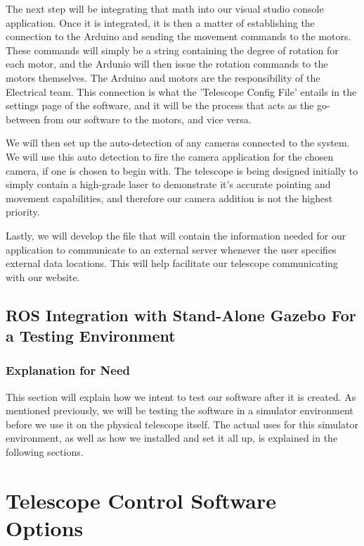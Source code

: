 \documentclass[12pt]{report}
\begin{document}
The next step will be integrating that math into our visual studio console application. Once it is integrated, it is then a matter of establishing the connection to the Arduino and sending the movement commands to the motors. These commands will simply be a string containing the degree of rotation for each motor, and the Ardunio will then issue the rotation commands to the motors themselves. The Arduino and motors are the responsibility of the Electrical team. This connection is what the 'Telescope Config File' entails in the settings page of the software, and it will be the process that acts as the go-between from our software to the motors, and vice versa.

We will then set up the auto-detection of any cameras connected to the system. We will use this auto detection to fire the camera application for the chosen camera, if one is chosen to begin with. The telescope is being designed initially to simply contain a high-grade laser to demonstrate it's accurate pointing and movement capabilities, and therefore our camera addition is not the highest priority.

Lastly, we will develop the file that will contain the information needed for our application to communicate to an external server whenever the user specifies external data locations. This will help facilitate our telescope communicating with our website.

\subsection*{ROS Integration with Stand-Alone Gazebo For a Testing Environment}

\subsubsection*{Explanation for Need}

This section will explain how we intent to test our software after it is created. As mentioned previously, we will be testing the software in a simulator environment before we use it on the physical telescope itself. The actual uses for this simulator environment, as well as how we installed and set it all up, is explained in the following sections.

\newpage

\section*{Telescope Control Software Options}
\end{document}
